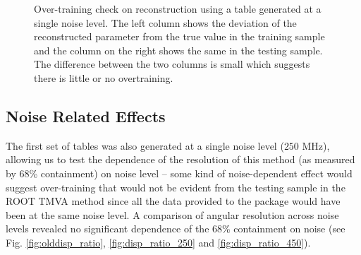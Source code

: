\documentclass[main.tex]{subfiles}
\begin{document}
\begin{figure}[H]
{    \label{fig:dispErr_test_overtraining}
  }
  \caption[Over-training test.]{Over-training check on reconstruction using a \disp table generated at a single noise level. The left column shows the deviation of the reconstructed parameter from the true value in the training sample and the column on the right shows the same in the testing sample. The difference between the two columns is small which suggests there is little or no overtraining.}
  \label{fig:overtraining}
\end{figure}

\subsection{Noise Related Effects}
The first set of \disp tables was also generated at a single noise level ($250$ MHz), allowing us to test the dependence of the resolution of this method (as measured by 68\% containment) on noise level -- some kind of noise-dependent effect would suggest over-training that would not be evident from the testing sample in the ROOT TMVA method since all the data provided to the package would have been at the same noise level. A comparison of angular resolution across noise levels revealed no significant dependence of the 68\% containment on noise (see Fig. \ref{fig:olddisp_ratio}, \ref{fig:disp_ratio_250} and \ref{fig:disp_ratio_450}).
\end{document}
